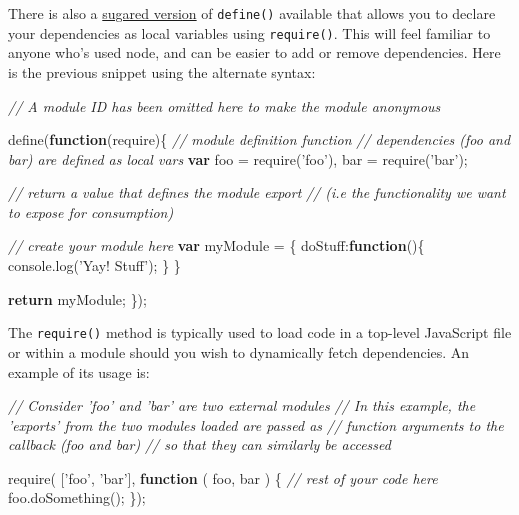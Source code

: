 \documentclass[9pt]{book}
\newenvironment{Shaded}{}{}
\newcommand{\KeywordTok}[1]{\textcolor[rgb]{0.00,0.44,0.13}{\textbf{{#1}}}}
\newcommand{\DataTypeTok}[1]{\textcolor[rgb]{0.56,0.13,0.00}{{#1}}}
\newcommand{\StringTok}[1]{\textcolor[rgb]{0.25,0.44,0.63}{{#1}}}
\newcommand{\CommentTok}[1]{\textcolor[rgb]{0.38,0.63,0.69}{\textit{{#1}}}}
\newcommand{\OtherTok}[1]{\textcolor[rgb]{0.00,0.44,0.13}{{#1}}}
\newcommand{\FunctionTok}[1]{\textcolor[rgb]{0.02,0.16,0.49}{{#1}}}
\newcommand{\NormalTok}[1]{{#1}}
\begin{document}
There is also a
\href{http://requirejs.org/docs/whyamd.html\#sugar}{sugared version} of
\texttt{define()} available that allows you to declare your dependencies
as local variables using \texttt{require()}. This will feel familiar to
anyone who's used node, and can be easier to add or remove dependencies.
Here is the previous snippet using the alternate syntax:

\begin{Shaded}
\begin{Highlighting}[]
\CommentTok{// A module ID has been omitted here to make the module anonymous}

\FunctionTok{define}\NormalTok{(}\KeywordTok{function}\NormalTok{(require)\{}
        \CommentTok{// module definition function}
    \CommentTok{// dependencies (foo and bar) are defined as local vars}
    \KeywordTok{var} \NormalTok{foo = }\FunctionTok{require}\NormalTok{(}\StringTok{'foo'}\NormalTok{),}
        \NormalTok{bar = }\FunctionTok{require}\NormalTok{(}\StringTok{'bar'}\NormalTok{);}

    \CommentTok{// return a value that defines the module export}
    \CommentTok{// (i.e the functionality we want to expose for consumption)}

    \CommentTok{// create your module here}
    \KeywordTok{var} \NormalTok{myModule = \{}
        \DataTypeTok{doStuff}\NormalTok{:}\KeywordTok{function}\NormalTok{()\{}
            \OtherTok{console}\NormalTok{.}\FunctionTok{log}\NormalTok{(}\StringTok{'Yay! Stuff'}\NormalTok{);}
        \NormalTok{\}}
    \NormalTok{\}}

    \KeywordTok{return} \NormalTok{myModule;}
\NormalTok{\});}
\end{Highlighting}
\end{Shaded}

The \texttt{require()} method is typically used to load code in a
top-level JavaScript file or within a module should you wish to
dynamically fetch dependencies. An example of its usage is:

\begin{Shaded}
\begin{Highlighting}[]
\CommentTok{// Consider 'foo' and 'bar' are two external modules}
\CommentTok{// In this example, the 'exports' from the two modules loaded are passed as}
\CommentTok{// function arguments to the callback (foo and bar)}
\CommentTok{// so that they can similarly be accessed}

\FunctionTok{require}\NormalTok{( [}\StringTok{'foo'}\NormalTok{, }\StringTok{'bar'}\NormalTok{], }\KeywordTok{function} \NormalTok{( foo, bar ) \{}
    \CommentTok{// rest of your code here}
    \OtherTok{foo}\NormalTok{.}\FunctionTok{doSomething}\NormalTok{();}
\NormalTok{\});}
\end{Highlighting}
\end{Shaded}
\end{document}

